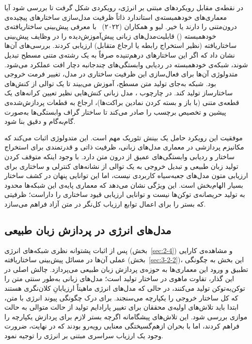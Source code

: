 در نقطه‌ی مقابل رویکردهای مبتنی بر انرژی، رویکردی شکل گرفت تا بررسی شود آیا معماری‌های خودهمبسته‌ی استاندارد ذاتاً ظرفیت مدل‌سازی ساختارهای پیچیده‌ی درون‌متنی را دارند یا خیر. لیو و همکاران (۲۰۲۲)~\cite{liu2022autoregressive} با معرفی پیش‌بینی ساختاریافته‌ی خودهمبسته () قابلیت‌مدل‌های زبانی پیش‌آموزش‌دیده را در وظایف پیش‌بینی ساختاریافته (نظیر استخراج رابطه یا ارجاع متقابل) ارزیابی کردند. بررسی‌های آن‌ها نشان داد که اگر این ساختارهای درهم‌تنیده صرفاً به یک رشته‌ی متنی مسطح تبدیل شوند، شبکه‌ی خودهمبسته در ردیابی وابستگی‌های چندجانبه دچار افت عملکرد می‌شود. متدولوژی آن‌ها برای فعال‌سازی این ظرفیت ساختاری در مدل، تغییر فرمت خروجی بود. شبکه به‌جای تولید متن مسطح، آموزش می‌بیند تا یک توالی از کنش‌های ساختارساز تولید کند. در چارچوب ، مدل زبانی کنش‌هایی نظیر تعیین کرانه‌های یک قطعه‌ی متنی (با باز و بسته کردن نمادین براکت‌ها)، ارجاع به قطعات پردازش‌شده‌ی پیشین و تخصیص برچسب را صادر می‌کند تا ساختار گراف وابستگی‌ها به‌صورت گام‌به‌گام و دقیق بنا شود.

موفقیت این رویکرد حامل یک بینش تئوریک مهم است. این متدولوژی اثبات می‌کند که مکانیزم پردازشی در معماری مدل‌های زبانی، ظرفیت ذاتی و قدرتمندی برای استخراج ساختار و ردیابی وابستگی‌های عمیق از درون متن دارد. با وجود اینکه متوقف کردن تولید زبان طبیعی و تبدیل خروجی به یک توالی از نشانه‌های کنترلی و ساختاری برای ارزیابی متون مدل‌های جعبه‌سیاه کاربردی نیست، اما این توانایی پنهان در کشف ساختار بسیار الهام‌بخش است. این ویژگی نشان می‌دهد که معماری پایه‌ی این شبکه‌ها محدود به تولید حریصانه‌ی توکن‌ها نیست و توانایی ارزیابی قیود ساختاری را داراست؛ ظرفیتی که بستر را برای اعمال توابع ارزیاب کل‌نگر در متن آزاد فراهم می‌سازد.


\subsection{مدل‌های انرژی در پردازش زبان طبیعی}\label{sec:3-2-3}

پس از اثبات پشتوانه نظری شبکه‌های انرژی (بخش~\ref{sec:2-4}) و مشاهده‌ی کارایی عملی آن‌ها در مسائل پیش‌بینی ساختاریافته (بخش~\ref{sec:3-2-2})، این بخش به چگونگی تطبیق و ورود این معماری‌ها به حوزه‌ی پردازش زبان طبیعی می‌پردازد. چالش اصلی در این گذار، تفاوت ماهوی در ساختار تولید است؛ مدل‌های زبانی به‌طور سنتی متن را توکن‌به‌توکن تولید می‌کنند، در حالی که مدل‌های انرژی ماهیتاً ارزیابانِ کلان‌نگری هستند که کل ساختار خروجی را یکپارچه می‌سنجند. برای درک چگونگی پیوند انرژی با متن، ابتدا باید تلاش‌های اولیه‌ی محققان برای تغییر پارادایم تولید از حالت متوالی به حالت موازی بررسی شود. این تلاش‌های پیشگامانه اگرچه بستر لازم برای پردازش یکپارچه را فراهم کردند، اما با بحران ازهم‌گسیختگی معنایی رویه‌رو بودند که در نهایت، ضرورت وجود یک ارزیاب سراسری مبتنی بر انرژی را توجیه نمود.


